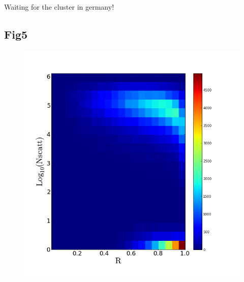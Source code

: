 \documentclass[12pt]{article}
\begin{document}
Waiting for the cluster in germany!

\subsection*{Fig5}
\begin{figure}
\includegraphics[scale=0.4]{Histogram2dNscattVSRadius.png}
\end{figure}
\end{document}
